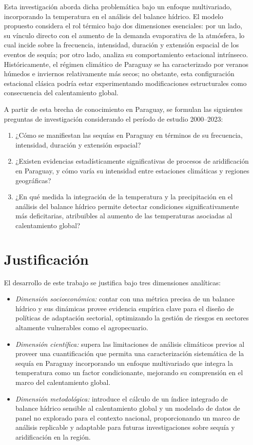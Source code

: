 Esta investigación aborda dicha problemática bajo un enfoque multivariado, incorporando la temperatura en el análisis del balance hídrico. El modelo propuesto considera el rol térmico bajo dos dimensiones esenciales: por un lado, su vínculo directo con el aumento de la demanda evaporativa de la atmósfera, lo cual incide sobre la frecuencia, intensidad, duración y extensión espacial de los eventos de sequía; por otro lado, analiza su comportamiento estacional intrínseco. Históricamente, el régimen climático de Paraguay se ha caracterizado por veranos húmedos e inviernos relativamente más secos; no obstante, esta configuración estacional clásica podría estar experimentando modificaciones estructurales como consecuencia del calentamiento global.

A partir de esta brecha de conocimiento en Paraguay, se formulan las siguientes preguntas de investigación considerando el período de estudio 2000--2023:
\begin{enumerate}
    \item ¿Cómo se manifiestan las sequías en Paraguay en términos de su frecuencia, intensidad, duración y extensión espacial? 
    \item ¿Existen evidencias estadísticamente significativas de procesos de aridificación en Paraguay, y cómo varía su intensidad entre estaciones climáticas y regiones geográficas? 
    \item ¿En qué medida la integración de la temperatura y la precipitación en el análisis del balance hídrico permite detectar condiciones significativamente más deficitarias, atribuibles al aumento de las temperaturas asociadas al calentamiento global?
\end{enumerate}

\section{Justificación}

El desarrollo de este trabajo se justifica bajo tres dimensiones analíticas:
\begin{itemize}
    \item \textit{Dimensión socioeconómica:} contar con una métrica precisa de un balance hídrico y sus  dinámicas provee evidencia empírica clave para el diseño de políticas de adaptación sectorial, optimizando la gestión de riesgos en sectores altamente vulnerables como el agropecuario.
    \item \textit{Dimensión científica:} supera las limitaciones de análisis climáticos previos al proveer una cuantificación que permita una caracterización sistemática de la sequía en Paraguay incorporando un enfoque multivariado que integra la temperatura como un factor condicionante, mejorando su comprensión en el marco del calentamiento global.
    \item \textit{Dimensión metodológica:} introduce el cálculo de un índice integrado de balance hídrico sensible al calentamiento global y un modelado de datos de panel no explorado para el contexto nacional, proporcionando un marco de análisis replicable y adaptable para futuras investigaciones sobre sequía y aridificación en la región.
\end{itemize}

